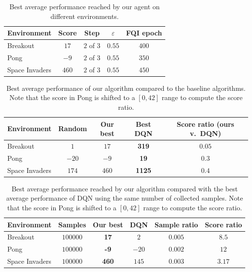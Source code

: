 %
\begin{table}
    \centering
    \begin{tabular}{l c c c c} 
	\hline
	Environment    & Score    & Step       & $\varepsilon$ & FQI epoch  \\ 
	\hline 
	Breakout       & $17$     & $2$ of $3$ & $0.55$        & $400$     \\
	Pong           & $-9$     & $2$ of $3$ & $0.55$        & $350$     \\
	Space Invaders & $460$    & $2$ of $3$ & $0.55$        & $450$     \\
	\hline
    \end{tabular}
    \caption[Performance of our algorithm]{Best average performance reached by 
	    our agent on different environments.}
    \label{t:avg_performance_only_ours}
\end{table}
%
%
\begin{table}
    \centering
    \begin{tabular}{l c c c c} 
	\hline
	Environment    & Random   & Our best & Best DQN      & Score ratio (ours v.\ DQN)  \\ 
	\hline 
	Breakout       & $1$      & $17$     & \textbf{319}  & $0.05$                     \\
	Pong           & $-20$    & $-9$     & \textbf{19}   & $0.3$                      \\
	Space Invaders & $174$    & $460$    & \textbf{1125} & $0.4$                      \\
	\hline
    \end{tabular}
    \caption[Performance of our algorithm w.r.t. the baselines]{Best average 
	     performance of our algorithm compared to the baseline algorithms.
	     Note that the score in Pong is shifted to a $[0, 42]$ range to 
	     compute the score ratio.}
    \label{t:avg_performance_main}
\end{table}
%
%
\begin{table}
    \centering
    \begin{tabular}{l c c c c c} 
	\hline
	Environment    & Samples  & Our best      & DQN    & Sample ratio   & Score ratio \\
	\hline 
	Breakout       & $100000$ & \textbf{17}   & $2$    & $0.005$        & $8.5$\\
	Pong           & $100000$ & \textbf{-9}   & $-20$  & $0.002$        & $12$\\
	Space Invaders & $100000$ & \textbf{460}  & $145 $ & $0.003$        & $3.17$\\
	\hline
    \end{tabular}
    \caption[Sample efficiency of our algorithm]{Best average performance 
	    reached by our algorithm compared with the best average performance
	    of DQN using the same number of collected samples. Note that the
	    score in Pong is shifted to a $[0, 42]$ range to compute the
	    score ratio.}
    \label{t:sample_efficiency_main}
\end{table}
%
    




